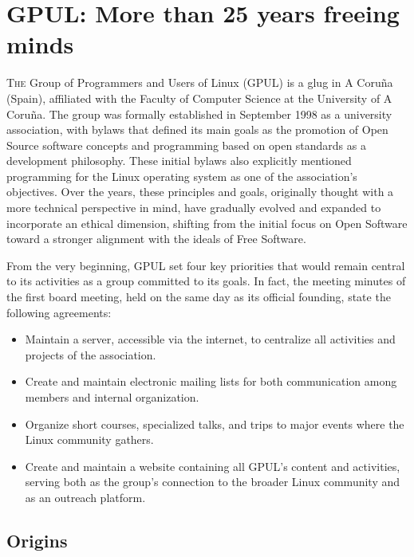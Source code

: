 %

\chapter{GPUL: More than 25 years freeing minds}
\label{chap:GPUL}

\lettrine{T}{he} Group of Programmers and Users of Linux (GPUL) is a
\gls{glug} in A Coruña (Spain), affiliated with the Faculty of
Computer Science at the University of A Coruña. The group was formally
established in September 1998 as a university association, with bylaws
that defined its main goals as the promotion of Open Source software
concepts and programming based on open standards as a development
philosophy. These initial bylaws also explicitly mentioned programming
for the Linux operating system as one of the association’s objectives.
Over the years, these principles and goals, originally thought with a
more technical perspective in mind, have gradually evolved and
expanded to incorporate an ethical dimension, shifting from the
initial focus on Open Software toward a stronger alignment with the
ideals of Free Software.

From the very beginning, GPUL set four key priorities that would remain
central to its activities as a group committed to its goals. In fact,
the meeting minutes of the first board meeting, held on the same day as its
official founding, state the following agreements:
\begin{itemize}
\item Maintain a server, accessible via the internet, to centralize all
activities and projects of the association.
\item Create and maintain electronic mailing lists for both communication
among members and internal organization.
\item Organize short courses, specialized talks, and trips to major events
where the Linux community gathers.
\item Create and maintain a website containing all GPUL’s content and
activities, serving both as the group’s connection to the broader
Linux community and as an outreach platform.
\end{itemize}

\section{Origins}

